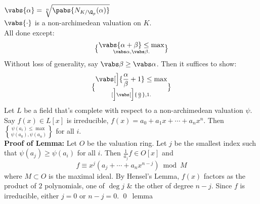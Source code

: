 %
%
$\vabs{\alpha}=\sqrt[n]{\pabs{N_{K/\Q_p}(\alpha)}}$ \\
\thm $\vabs{\cdot}$ is a non-archimedean valuation on $K$. \\
\pf All done except:
\[ \vabs{\alpha+\beta} \leq \max\brace{\vabs\alpha,\vabs\beta} . \]
Without loss of generality, say $\vabs\beta\geq\vabs\alpha$.  Then it suffices to show: \[\vabs[\Big]{\frac{\alpha}{\beta}+1}\leq\max\brace[\Big]{\vabs[\Big]{\frac{\alpha}{\beta}},1}.\]
\lemma Let $L$ be a field that's complete with respect to a non-archimedean valuation $\psi$.  Say $f(x)\in L[x]$ is irreducible, $f(x)=a_0+a_1x+\dotsb+a_nx^n$.  Then $\psi(a_i)\leq\max\brace{\psi(a_0),\psi(a_n)}$ for all $i$. \\
\textbf{Proof of Lemma: }Let $O$ be the valuation ring.  Let $j$ be the smallest index such that $\psi(a_j)\geq\psi(a_i)$ for all $i$.  Then $\frac1{a_j}f\in O[x]$ and
\[ f \equiv x^j (a_j + \dotsb + a_n x^{n-j}) \bmod M \]
where $M\subset O$ is the maximal ideal.  By Hensel's Lemma, $f(x)$ factors as the product of $2$ polynomials, one of $\deg j$ \& the other of degree $n-j$.  Since $f$ is irreducible, either $j=0$ or $n-j=0$. \qed~lemma

